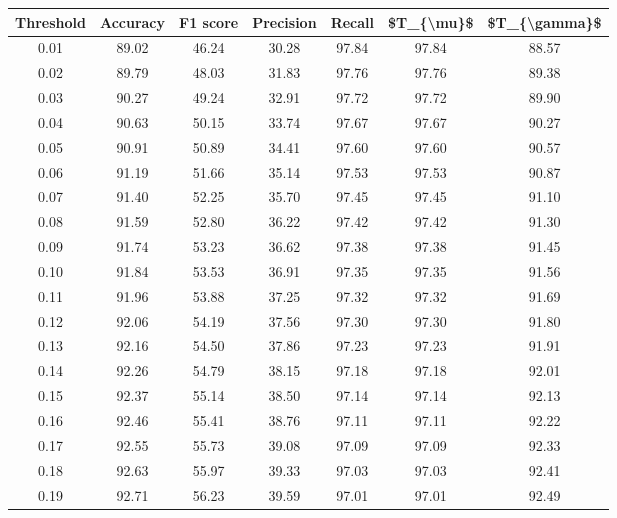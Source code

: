 \begin{tabular}{|c|c|c|c|c|c|c|}
\hline
 Threshold &  Accuracy &  F1 score &  Precision &  Recall &  \$T\_\{\textbackslash mu\}\$ &  \$T\_\{\textbackslash gamma\}\$ \\
\hline
      0.01 &     89.02 &     46.24 &      30.28 &   97.84 &      97.84 &         88.57 \\
      0.02 &     89.79 &     48.03 &      31.83 &   97.76 &      97.76 &         89.38 \\
      0.03 &     90.27 &     49.24 &      32.91 &   97.72 &      97.72 &         89.90 \\
      0.04 &     90.63 &     50.15 &      33.74 &   97.67 &      97.67 &         90.27 \\
      0.05 &     90.91 &     50.89 &      34.41 &   97.60 &      97.60 &         90.57 \\
      0.06 &     91.19 &     51.66 &      35.14 &   97.53 &      97.53 &         90.87 \\
      0.07 &     91.40 &     52.25 &      35.70 &   97.45 &      97.45 &         91.10 \\
      0.08 &     91.59 &     52.80 &      36.22 &   97.42 &      97.42 &         91.30 \\
      0.09 &     91.74 &     53.23 &      36.62 &   97.38 &      97.38 &         91.45 \\
      0.10 &     91.84 &     53.53 &      36.91 &   97.35 &      97.35 &         91.56 \\
      0.11 &     91.96 &     53.88 &      37.25 &   97.32 &      97.32 &         91.69 \\
      0.12 &     92.06 &     54.19 &      37.56 &   97.30 &      97.30 &         91.80 \\
      0.13 &     92.16 &     54.50 &      37.86 &   97.23 &      97.23 &         91.91 \\
      0.14 &     92.26 &     54.79 &      38.15 &   97.18 &      97.18 &         92.01 \\
      0.15 &     92.37 &     55.14 &      38.50 &   97.14 &      97.14 &         92.13 \\
      0.16 &     92.46 &     55.41 &      38.76 &   97.11 &      97.11 &         92.22 \\
      0.17 &     92.55 &     55.73 &      39.08 &   97.09 &      97.09 &         92.33 \\
      0.18 &     92.63 &     55.97 &      39.33 &   97.03 &      97.03 &         92.41 \\
      0.19 &     92.71 &     56.23 &      39.59 &   97.01 &      97.01 &         92.49 \\

\end{tabular}
